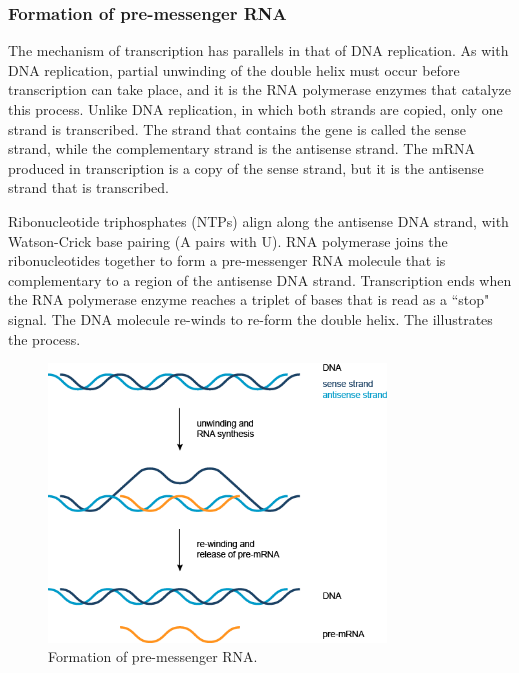 \subsubsection{Formation of pre-messenger RNA}
The mechanism of transcription has parallels in that of DNA replication. As with DNA replication, partial unwinding of the double helix must occur before transcription can take place, and it is the RNA polymerase enzymes that catalyze this process. Unlike DNA replication, in which both strands are copied, only one strand is transcribed. The strand that contains the gene is called the sense strand, while the complementary strand is the antisense strand. The mRNA produced in transcription is a copy of the sense strand, but it is the antisense strand that is transcribed. 

Ribonucleotide triphosphates (NTPs) align along the antisense DNA strand, with Watson-Crick base pairing (A pairs with U). RNA polymerase joins the ribonucleotides together to form a pre-messenger RNA molecule that is complementary to a region of the antisense DNA strand. Transcription ends when the RNA polymerase enzyme reaches a triplet of bases that is read as a ``stop" signal. The DNA molecule re-winds to re-form the double helix. The  illustrates the process.
\begin{figure}[!tb]
	\centering
	\includegraphics[width=0.8\textwidth]{figures/transcription}
	\caption{Formation of pre-messenger RNA.}
	\label{fig:transcription}
\end{figure}

